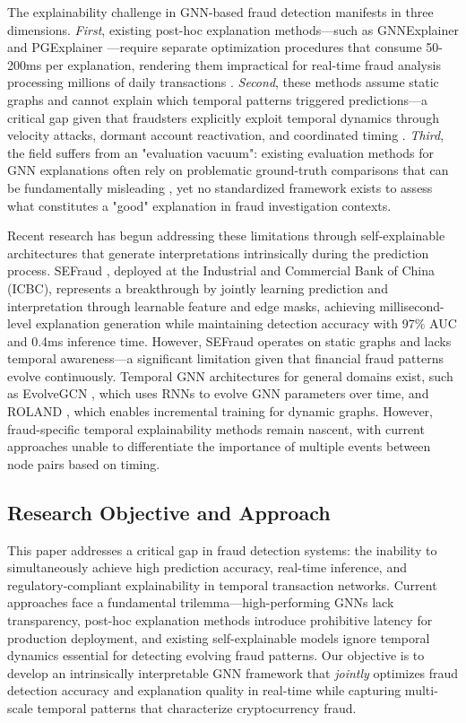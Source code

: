 The explainability challenge in GNN-based fraud detection manifests in three dimensions. \textit{First}, existing post-hoc explanation methods—such as GNNExplainer \citep{ying2019gnnexplainer} and PGExplainer \citep{luo2020pgexplainer}—require separate optimization procedures that consume 50-200ms per explanation, rendering them impractical for real-time fraud analysis processing millions of daily transactions \citep{lu2022bright}. \textit{Second}, these methods assume static graphs and cannot explain which temporal patterns triggered predictions—a critical gap given that fraudsters explicitly exploit temporal dynamics through velocity attacks, dormant account reactivation, and coordinated timing \citep{weber2019anti}. \textit{Third}, the field suffers from an "evaluation vacuum": existing evaluation methods for GNN explanations often rely on problematic ground-truth comparisons that can be fundamentally misleading \citep{faber2021groundtruth}, yet no standardized framework exists to assess what constitutes a "good" explanation in fraud investigation contexts.

Recent research has begun addressing these limitations through self-explainable architectures that generate interpretations intrinsically during the prediction process. SEFraud \citep{li2024sefraud}, deployed at the Industrial and Commercial Bank of China (ICBC), represents a breakthrough by jointly learning prediction and interpretation through learnable feature and edge masks, achieving millisecond-level explanation generation while maintaining detection accuracy with 97\% AUC and 0.4ms inference time. However, SEFraud operates on static graphs and lacks temporal awareness—a significant limitation given that financial fraud patterns evolve continuously. Temporal GNN architectures for general domains exist, such as EvolveGCN \citep{pareja2020evolvegcn}, which uses RNNs to evolve GNN parameters over time, and ROLAND \citep{you2022roland}, which enables incremental training for dynamic graphs. However, fraud-specific temporal explainability methods remain nascent, with current approaches unable to differentiate the importance of multiple events between node pairs based on timing.

\subsection*{Research Objective and Approach}

This paper addresses a critical gap in fraud detection systems: the inability to simultaneously achieve high prediction accuracy, real-time inference, and regulatory-compliant explainability in temporal transaction networks. Current approaches face a fundamental trilemma—high-performing GNNs lack transparency, post-hoc explanation methods introduce prohibitive latency for production deployment, and existing self-explainable models ignore temporal dynamics essential for detecting evolving fraud patterns. Our objective is to develop an intrinsically interpretable GNN framework that \textit{jointly} optimizes fraud detection accuracy and explanation quality in real-time while capturing multi-scale temporal patterns that characterize cryptocurrency fraud.

